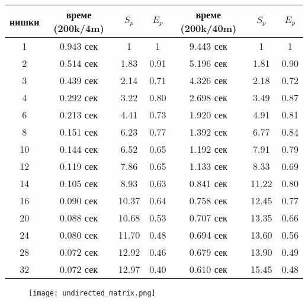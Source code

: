 \begin{center}
\begin{tabular}{ | c | c c c | c c c | }
  нишки & време (200k/4m) & $S_p$ & $E_p$ & време (200k/40m) & $S_p$ & $E_p$ \\
  \hline
  1  & 0.943 сек & 1     & 1    & 9.443 сек & 1 & 1 \\
  2  & 0.514 сек & 1.83  & 0.91 & 5.196 сек & 1.81 & 0.90 \\
  3  & 0.439 сек & 2.14  & 0.71 & 4.326 сек & 2.18 & 0.72 \\
  4  & 0.292 сек & 3.22  & 0.80 & 2.698 сек & 3.49 & 0.87 \\
  6  & 0.213 сек & 4.41  & 0.73 & 1.920 сек & 4.91 & 0.81 \\
  8  & 0.151 сек & 6.23  & 0.77 & 1.392 сек & 6.77 & 0.84 \\
  10 & 0.144 сек & 6.52  & 0.65 & 1.192 сек & 7.91 & 0.79 \\
  12 & 0.119 сек & 7.86  & 0.65 & 1.133 сек & 8.33 & 0.69 \\
  14 & 0.105 сек & 8.93  & 0.63 & 0.841 сек & 11.22 & 0.80 \\
  16 & 0.090 сек & 10.37 & 0.64 & 0.758 сек & 12.45 & 0.77 \\
  20 & 0.088 сек & 10.68 & 0.53 & 0.707 сек & 13.35 & 0.66 \\
  24 & 0.080 сек & 11.70 & 0.48 & 0.694 сек & 13.60 & 0.56 \\
  28 & 0.072 сек & 12.92 & 0.46 & 0.679 сек & 13.90 & 0.49 \\
  32 & 0.072 сек & 12.97 & 0.40 & 0.610 сек & 15.45 & 0.48 \\
\end{tabular}
\end{center}

\begin{figure}[H]
  \centering
  \texttt{[image: undirected\_matrix.png]}
\end{figure}
